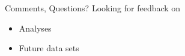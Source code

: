 \documentclass[ 12pt, xcolor=beamer,table,usenames,dvipsnames, ignorenonframetext, ngerman]{beamer}
\begin{document}
\begin{frame}{\large Comments, Questions?}
	Looking for feedback on
	\smallskip
	\begin{itemize}
	\item Analyses
	\item Future data sets
	\end{itemize}
\end{frame}

\appendix

\end{document}
